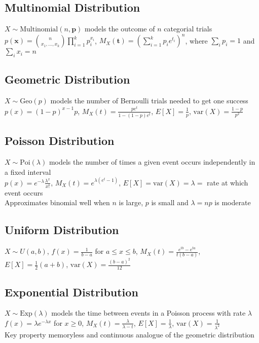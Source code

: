 \documentclass{article}
\newcommand{\V}{\mbox{var}}
\begin{document}
\subsection{Multinomial Distribution}
$X\sim \mbox{Multinomial}(n, \boldsymbol p)$ models the outcome of $n$ categorial trials \\
$p(\boldsymbol x) = \binom{n}{x_1, \ldots, x_k} \prod\limits_{i=1}^k p_i^{x_i}$, $M_X(\boldsymbol t) = (\sum\limits_{i=1}^k p_i e^{t_i})^n$, where $\sum_i p_i = 1$ and $\sum_i x_i = n$

\subsection{Geometric Distribution}
$X \sim \mbox{Geo}(p)$ models the number of Bernoulli trials needed to get one success \\
$p(x) = (1-p)^{x-1}p$, $M_X(t) = \frac{pe^t}{1-(1-p)e^t}$, $E[X] = \frac{1}{p}$, $\V(X) = \frac{1-p}{p^2}$

\subsection{Poisson Distribution}
$X\sim \mbox{Poi}(\lambda)$ models the number of times a given event occurs independently in a fixed interval \\
$p(x) = e^{-\lambda}\frac{\lambda^x}{x!}$, $M_X(t) = e^{\lambda(e^t - 1)}$, $E[X] = \V(X) = \lambda =$ rate at which event occurs \\
Approximates binomial well when $n$ is large, $p$ is small and $\lambda = np$ is moderate

\subsection{Uniform Distribution}
$X\sim U(a, b)$, $f(x) = \frac{1}{b-a}$ for $a \leq x \leq b$, $M_X(t) = \frac{e^{tb} - e^{ta}}{t(b-a)}$, $E[X] = \frac{1}{2}(a+b)$, $\V(X) = \frac{(b-a)^2}{12}$ 

\subsection{Exponential Distribution}
$X\sim \mbox{Exp}(\lambda)$ models the time between events in a Poisson process with rate $\lambda$ \\
$f(x) = \lambda e^{-\lambda x}$ for $x \geq 0$, $M_X(t) = \frac{\lambda}{\lambda - t}$, $E[X] = \frac{1}{\lambda}$, $\V(X) = \frac{1}{\lambda^2}$ \\
Key property memoryless and continuous analogue of the geometric distribution 
\end{document}
